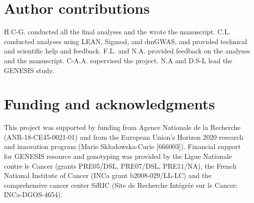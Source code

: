 \documentclass[draft,twocolumn, 11pt]{article}
\begin{document}
\section*{Author contributions}

H.C-G. conducted all the final analyses and the wrote the manuscript. C.L. conducted analyses using LEAN, Sigmod, and dmGWAS, and provided technical and scientific help and feedback. F.L. and N.A. provided feedback on the analyses and the manuscript. C-A.A. supervised the project. N.A and D.S-L lead the GENESIS study.

\section*{Funding and acknowledgments}

This project was supported by funding from Agence Nationale de la Recherche (ANR-18-CE45-0021-01) and from the European Union’s Horizon 2020 research and innovation program (Marie Skłodowska-Curie [666003]). Financial support for GENESIS resource and genotyping was provided by the Ligue Nationale contre le Cancer (grants PRE05/DSL, PRE07/DSL, PRE11/NA), the French National Institute of Cancer (INCa grant b2008-029/LL-LC) and the comprehensive cancer center SiRIC (Site de Recherche Intégrée sur le Cancer: INCa-DGOS-4654).
\end{document}
